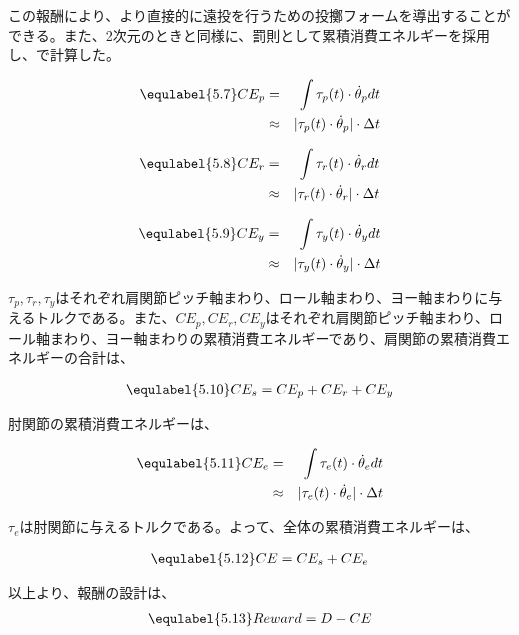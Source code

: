 この報酬により、より直接的に遠投を行うための投擲フォームを導出することができる。また、2次元のときと同様に、罰則として累積消費エネルギーを採用し、で計算した。

\begin{eqnarray}
  \equlabel{5.7}
  CE_{p}&=&\int \tau_{p}(t)\cdot\dot{\theta}_{p} dt\\
        &\approx&|\tau_{p}(t)\cdot\dot{\theta}_{p}|\cdot\Delta t
\end{eqnarray}

\begin{eqnarray}
  \equlabel{5.8}
  CE_{r}&=&\int \tau_{r}(t)\cdot\dot{\theta}_{r} dt\\
        &\approx&|\tau_{r}(t)\cdot\dot{\theta}_{r}|\cdot\Delta t
\end{eqnarray}

\begin{eqnarray}
  \equlabel{5.9}
  CE_{y}&=&\int \tau_{y}(t)\cdot\dot{\theta}_{y} dt\\
        &\approx&|\tau_{y}(t)\cdot\dot{\theta}_{y}|\cdot\Delta t
\end{eqnarray}

$\tau_{p},\tau_{r},\tau_{y}$はそれぞれ肩関節ピッチ軸まわり、ロール軸まわり、ヨー軸まわりに与えるトルクである。また、$CE_{p},CE_{r},CE_{y}$はそれぞれ肩関節ピッチ軸まわり、ロール軸まわり、ヨー軸まわりの累積消費エネルギーであり、肩関節の累積消費エネルギーの合計は、

\begin{eqnarray}
  \equlabel{5.10}
  CE_{s} = CE_{p} + CE_{r} + CE_{y}
\end{eqnarray}

肘関節の累積消費エネルギーは、

\begin{eqnarray}
  \equlabel{5.11}
  CE_{e}&=&\int \tau_{e}(t)\cdot\dot{\theta}_{e} dt\\
        &\approx&|\tau_{e}(t)\cdot\dot{\theta}_{e}|\cdot\Delta t
\end{eqnarray}

$\tau_{e}$は肘関節に与えるトルクである。よって、全体の累積消費エネルギーは、

\begin{eqnarray}
  \equlabel{5.12}
  CE = CE_{s} + CE_{e}
\end{eqnarray}

以上より、報酬の設計は、
\begin{eqnarray}
  \equlabel{5.13}
  Reward = D - CE
\end{eqnarray}

